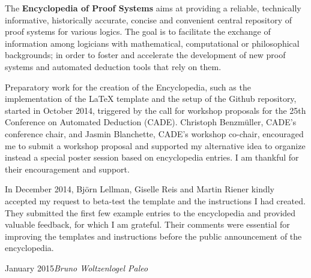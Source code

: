 
\preface

The \textbf{Encyclopedia of Proof Systems} aims at providing a reliable, technically informative, historically accurate, concise and convenient central repository of proof systems for various logics. The goal is to facilitate the exchange of information among logicians with mathematical, computational or philosophical backgrounds; in order to foster and accelerate the development of new proof systems and automated deduction tools that rely on them.

Preparatory work for the creation of the Encyclopedia, such as the implementation of the LaTeX template and the setup of the Github repository, started in October 2014, triggered by the call for workshop proposals for the 25th Conference on Automated Deduction (CADE). Christoph Benzm\"uller, CADE's conference chair, and Jasmin Blanchette, CADE's workshop co-chair, encouraged me to submit a workshop proposal and supported my alternative idea to organize instead a special poster session based on encyclopedia entries. I am thankful for their encouragement and support.

In December 2014, Bj\"orn Lellman, Giselle Reis and Martin Riener kindly accepted my request to beta-test the template and the instructions I had created. They submitted the first few example entries to the encyclopedia and provided valuable feedback, for which I am grateful. Their comments were essential for improving the templates and instructions before the public announcement of the encyclopedia.

 

\vspace{\baselineskip}
\begin{flushright}\noindent
January 2015\hfill {\it Bruno Woltzenlogel Paleo}
\end{flushright}


